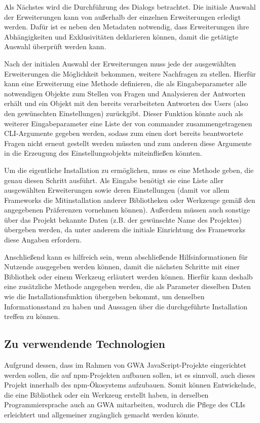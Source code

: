 Als Nächstes wird die Durchführung des Dialogs betrachtet. Die initiale Auswahl der Erweiterungen kann von außerhalb der einzelnen Erweiterungen erledigt werden. Dafür ist es neben den Metadaten notwendig, dass Erweiterungen ihre Abhängigkeiten und Exklusivitäten deklarieren können, damit die getätigte Auswahl überprüft werden kann.

Nach der initialen Auswahl der Erweiterungen muss jede der ausgewählten Erweiterungen die Möglichkeit bekommen, weitere Nachfragen zu stellen. Hierfür kann eine Erweiterung eine Methode definieren, die als Eingabeparameter alle notwendigen Objekte zum Stellen von Fragen und Analysieren der Antworten erhält und ein Objekt mit den bereits verarbeiteten Antworten des Users (also den gewünschten Einstellungen) zurückgibt. Dieser Funktion könnte auch als weiterer Eingabeparameter eine Liste der von commander zusammengetragenen \gls{CLI}-Argumente gegeben werden, sodass zum einen dort bereits beantwortete Fragen nicht erneut gestellt werden müssten und zum anderen diese Argumente in die Erzeugung des Einstellungsobjekts miteinfließen könnten.

Um die eigentliche Installation zu ermöglichen, muss es eine Methode geben, die genau diesen Schritt ausführt. Als Eingabe benötigt sie eine Liste aller ausgewählten Erweiterungen sowie deren Einstellungen (damit vor allem Frameworks die Mitinstallation anderer Bibliotheken oder Werkzeuge gemäß den angegebenen Präferenzen vornehmen können). Außerdem müssen auch sonstige über das Projekt bekannte Daten (z.B. der gewünschte Name des Projektes) übergeben werden, da unter anderem die initiale Einrichtung des Frameworks diese Angaben erfordern.

Anschließend kann es hilfreich sein, wenn abschließende Hilfsinformationen für Nutzende ausgegeben werden können, damit die nächsten Schritte mit einer Bibliothek oder einem Werkzeug erläutert werden können. Hierfür kann deshalb eine zusätzliche Methode angegeben werden, die als Parameter dieselben Daten wie die Installationsfunktion übergeben bekommt, um denselben Informationsstand zu haben und Aussagen über die durchgeführte Installation treffen zu können.

\subsection{Zu verwendende Technologien}
Aufgrund dessen, dass im Rahmen von \gls{GWA} JavaScript-Projekte eingerichtet werden sollen, die auf \gls{npm}-Projekten aufbauen sollen, ist es sinnvoll, auch dieses Projekt innerhalb des \gls{npm}-Ökosystems aufzubauen. Somit können Entwickelnde, die eine Bibliothek oder ein Werkzeug erstellt haben, in derselben Programmiersprache auch an \gls{GWA} mitarbeiten, wodurch die Pflege des \gls{CLI}s erleichtert und allgemeiner zugänglich gemacht werden könnte.

